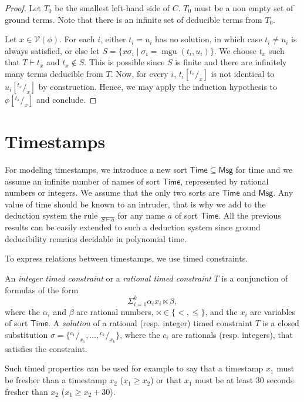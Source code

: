 \documentclass[acmtocl,acmnow]{acmtrans2m}
\newcommand{\var}{\mathcal{V}}
\newcommand{\mgu}{\operatorname{mgu}}
\newcommand{\subst}[2]{{}^{#2}\!/_{\!#1}}
\newcommand{\term}{\mathsf{Msg}}
\newcommand{\Time}{\mathsf{Time}}
\begin{document}
\begin{proof}
Let $T_0$ be the smallest left-hand
side of $C$. $T_0$ must be a non empty set of ground terms. Note that there is
an infinite set of deducible terms from $T_0$.


Let $x\in \var(\phi)$. For each $i$, either $t_i=u_i$ has no solution,
in which case $t_i\neq u_i$ is always satisfied, or else let $S= \{
x\sigma_i \mid \sigma_i=\mgu(t_i,u_i)\}$.  We choose $t_x$ such that
$T\vdash t_x$ and $t_x\notin S$. This is possible since $S$ is finite and there are
infinitely many terms deducible from $T$. Now, for every $i$,
$t_i[\subst{x}{t_x}]$ is not identical to $u_i[\subst{x}{t_x}]$ by
construction. Hence, we may apply the induction hypothesis to
$\phi[\subst{x}{t_x}]$ and conclude.
\end{proof}


\section{Timestamps}\label{sec:timestamps}
For modeling timestamps, we introduce a new sort $\Time\subseteq
\term$ for time and we assume an infinite number of names of sort
$\Time$, represented by rational numbers or integers. We assume that the only two sorts are $\Time$ and
$\term$. Any value of
time should be known to an intruder, that is why we add to the
deduction system the rule {\small$\displaystyle\frac{}{S\vdash a}$}
for any name $a$ of sort $\Time$. All the previous results
can be easily extended to such a deduction system since ground
deducibility remains decidable in polynomial time.




To express relations between timestamps, we use timed constraints. 
\begin{definition}
An \emph{integer timed constraint} or a
\emph{rational timed constraint} $T$ is a conjunction of formulas of the form
$$\Sigma_{i=1}^k \alpha_i x_i \ltimes \beta,$$
where the $\alpha_i$ and $\beta$ are rational numbers, $\ltimes\in\{<,\leq\}$, and the $x_i$ are variables
of sort $\Time$. A \emph{solution} of a rational (resp. integer) timed constraint $T$ is a closed
substitution $\sigma = \{\subst{x_1}{c_1},\ldots, \subst{x_k}{c_k}\}$, where the $c_i$ are rationals (resp.
integers), that satisfies the constraint.
\end{definition}




Such timed properties can be used for example to say that a
timestamp $x_1$ must be fresher than a timestamp $x_2$ ($x_1\geq
x_2$) or that $x_1$ must be at least 30 seconds fresher than
$x_2$ ($x_1\geq x_2 + 30$).
\end{document}
